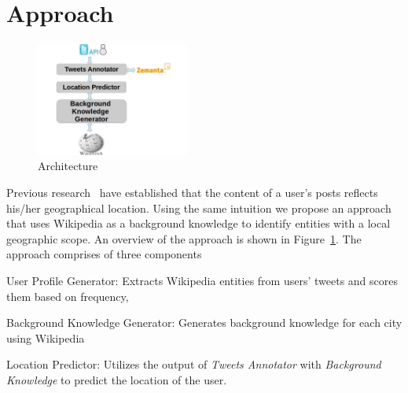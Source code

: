  
\section{Approach}
\label{sec:approach}
\begin{figure}
\centering
\includegraphics[width = 5cm]{images/architecture-2.jpg}
\caption{Architecture}
\label{fig:architecture}
\end{figure}
\vspace*{-1.00em}
Previous research~\cite{bo2012geolocation,cheng2010you} have established that the content of a user's posts reflects his/her geographical location. Using the same intuition we propose an approach that uses Wikipedia as a background knowledge to identify entities with a local geographic scope. An overview of the approach is shown in Figure~\ref{fig:architecture}. The approach comprises of three components \begin{inparaenum}[(1)]\item User Profile Generator: Extracts Wikipedia entities from users' tweets and scores them based on frequency, \item Background Knowledge Generator: Generates background knowledge for each city using Wikipedia \item Location Predictor: Utilizes the output of \textit{Tweets Annotator} with \textit{Background Knowledge} to predict the location of the user. \end{inparaenum} 

